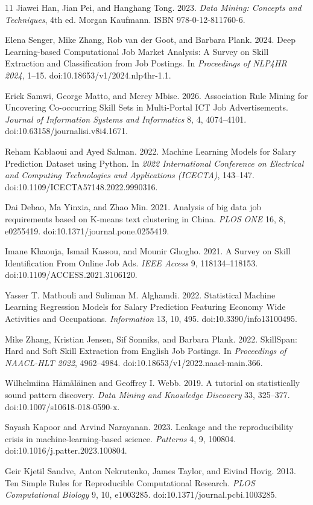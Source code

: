 \documentclass[sigconf,nonacm]{acmart}
\begin{document}
\begin{thebibliography}{11}
Jiawei Han, Jian Pei, and Hanghang Tong. 2023. \textit{Data Mining: Concepts and Techniques}, 4th ed. Morgan Kaufmann. ISBN 978-0-12-811760-6.

Elena Senger, Mike Zhang, Rob van der Goot, and Barbara Plank. 2024. Deep Learning-based Computational Job Market Analysis: A Survey on Skill Extraction and Classification from Job Postings. In \textit{Proceedings of NLP4HR 2024}, 1--15. doi:10.18653/v1/2024.nlp4hr-1.1.

Erick Samwi, George Matto, and Mercy Mbise. 2026. Association Rule Mining for Uncovering Co-occurring Skill Sets in Multi-Portal ICT Job Advertisements. \textit{Journal of Information Systems and Informatics} 8, 4, 4074--4101. doi:10.63158/journalisi.v8i4.1671.

Reham Kablaoui and Ayed Salman. 2022. Machine Learning Models for Salary Prediction Dataset using Python. In \textit{2022 International Conference on Electrical and Computing Technologies and Applications (ICECTA)}, 143--147. doi:10.1109/ICECTA57148.2022.9990316.

Dai Debao, Ma Yinxia, and Zhao Min. 2021. Analysis of big data job requirements based on K-means text clustering in China. \textit{PLOS ONE} 16, 8, e0255419. doi:10.1371/journal.pone.0255419.

Imane Khaouja, Ismail Kassou, and Mounir Ghogho. 2021. A Survey on Skill Identification From Online Job Ads. \textit{IEEE Access} 9, 118134--118153. doi:10.1109/ACCESS.2021.3106120.

Yasser T. Matbouli and Suliman M. Alghamdi. 2022. Statistical Machine Learning Regression Models for Salary Prediction Featuring Economy Wide Activities and Occupations. \textit{Information} 13, 10, 495. doi:10.3390/info13100495.

Mike Zhang, Kristian Jensen, Sif Sonniks, and Barbara Plank. 2022. SkillSpan: Hard and Soft Skill Extraction from English Job Postings. In \textit{Proceedings of NAACL-HLT 2022}, 4962--4984. doi:10.18653/v1/2022.naacl-main.366.

Wilhelmiina H\"am\"al\"ainen and Geoffrey I. Webb. 2019. A tutorial on statistically sound pattern discovery. \textit{Data Mining and Knowledge Discovery} 33, 325--377. doi:10.1007/s10618-018-0590-x.

Sayash Kapoor and Arvind Narayanan. 2023. Leakage and the reproducibility crisis in machine-learning-based science. \textit{Patterns} 4, 9, 100804. doi:10.1016/j.patter.2023.100804.

Geir Kjetil Sandve, Anton Nekrutenko, James Taylor, and Eivind Hovig. 2013. Ten Simple Rules for Reproducible Computational Research. \textit{PLOS Computational Biology} 9, 10, e1003285. doi:10.1371/journal.pcbi.1003285.
\end{thebibliography}
\end{document}
